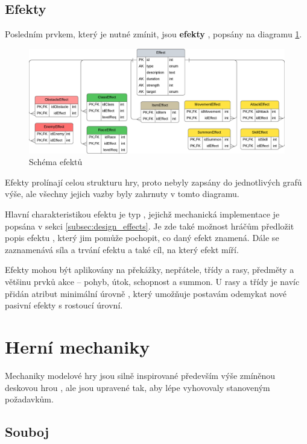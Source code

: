 \subsection{Efekty}
\label{subsec:schema_effect}

Posledním prvkem, který je nutné zmínit, jsou \textbf{efekty} , popsány na diagramu \ref{diag:er_effect}.

\begin{figure}[h]
    \centering
    \includegraphics[scale=0.76]{../../shared/diagrams/er_effect.pdf}
    \caption{Schéma efektů}
    \label{diag:er_effect}
\end{figure}

Efekty prolínají celou strukturu hry, proto nebyly zapsány do jednotlivých grafů výše, ale všechny jejich vazby byly zahrnuty v tomto diagramu. 

Hlavní charakteristikou efektu je typ , jejichž mechanická implementace je popsána v sekci \ref{subsec:design_effects}. Je zde také možnost hráčům předložit popis efektu , který jim pomůže pochopit, co daný efekt znamená. Dále se zaznamenává síla a trvání efektu a také cíl, na který efekt míří.

Efekty mohou být aplikovány na překážky, nepřátele, třídy a rasy, předměty a většinu prvků akce -- pohyb, útok, schopnost a summon. U rasy a třídy je navíc přidán atribut minimální úrovně , který umožňuje postavám odemykat nové pasivní efekty s rostoucí úrovní.


\section{Herní mechaniky}
\label{sec:design_mechanics}

Mechaniky modelové hry jsou silně inspirované především výše zmíněnou deskovou hrou , ale jsou upravené tak, aby lépe vyhovovaly stanoveným požadavkům.


\subsection{Souboj}
\label{subsec:design_encounter}

